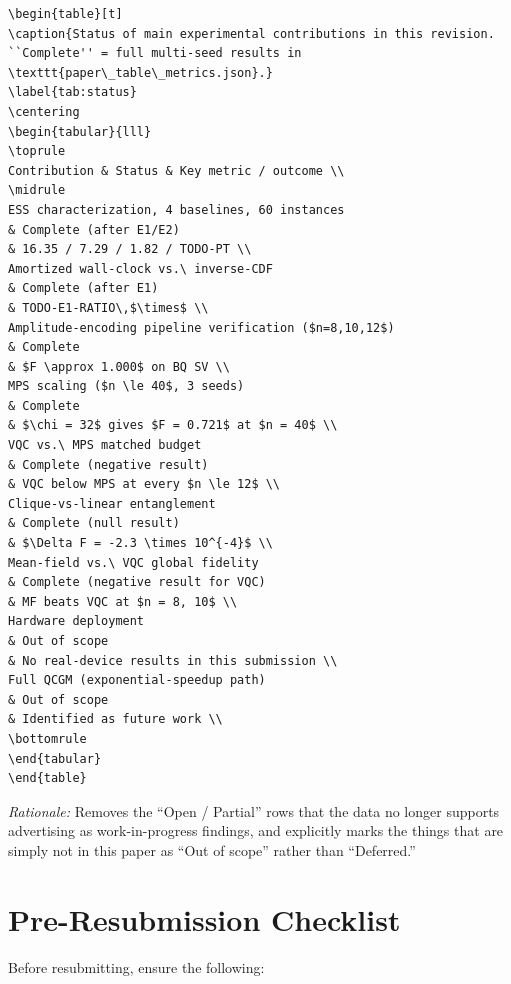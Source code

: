 \begin{verbatim}
\begin{table}[t]
\caption{Status of main experimental contributions in this revision.
``Complete'' = full multi-seed results in
\texttt{paper\_table\_metrics.json}.}
\label{tab:status}
\centering
\begin{tabular}{lll}
\toprule
Contribution & Status & Key metric / outcome \\
\midrule
ESS characterization, 4 baselines, 60 instances
& Complete (after E1/E2)
& 16.35 / 7.29 / 1.82 / TODO-PT \\
Amortized wall-clock vs.\ inverse-CDF
& Complete (after E1)
& TODO-E1-RATIO\,$\times$ \\
Amplitude-encoding pipeline verification ($n=8,10,12$)
& Complete
& $F \approx 1.000$ on BQ SV \\
MPS scaling ($n \le 40$, 3 seeds)
& Complete
& $\chi = 32$ gives $F = 0.721$ at $n = 40$ \\
VQC vs.\ MPS matched budget
& Complete (negative result)
& VQC below MPS at every $n \le 12$ \\
Clique-vs-linear entanglement
& Complete (null result)
& $\Delta F = -2.3 \times 10^{-4}$ \\
Mean-field vs.\ VQC global fidelity
& Complete (negative result for VQC)
& MF beats VQC at $n = 8, 10$ \\
Hardware deployment
& Out of scope
& No real-device results in this submission \\
Full QCGM (exponential-speedup path)
& Out of scope
& Identified as future work \\
\bottomrule
\end{tabular}
\end{table}
\end{verbatim}

\noindent\emph{Rationale:} Removes the ``Open / Partial'' rows that the
data no longer supports advertising as work-in-progress findings, and
explicitly marks the things that are simply not in this paper as
``Out of scope'' rather than ``Deferred.''

\section{Pre-Resubmission Checklist}

Before resubmitting, ensure the following:

